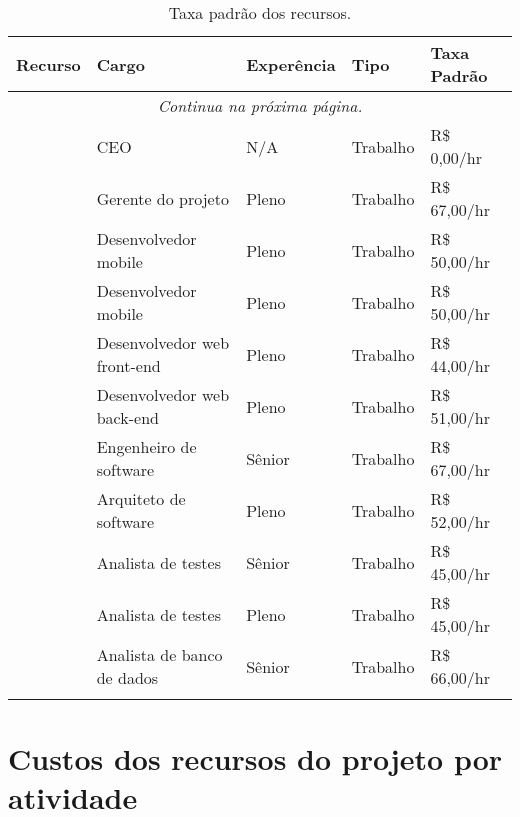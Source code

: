 \begin{longtable}{ p{} p{} l l l }
	\toprule
	\textbf{Recurso}      & \textbf{Cargo}              & \textbf{Experência} & \textbf{Tipo} & \textbf{Taxa Padrão} \\
	\midrule
	\endhead
	\multicolumn{5}{c}{{\textit{Continua na próxima página.}}} \\
	\caption{Taxa padrão dos recursos.}
	\endfoot
	\endlastfoot
	\ceoName{}            & CEO                         & N/A                  & Trabalho      & R\$ 0,00/hr           \\
	\midrule
	\projectManagerName{} & Gerente do projeto          & Pleno                & Trabalho      & R\$ 67,00/hr          \\
	\midrule
	\mobDevOneName{}      & Desenvolvedor mobile        & Pleno                & Trabalho      & R\$ 50,00/hr          \\
	\midrule
	\mobDevTwoName{}      & Desenvolvedor mobile        & Pleno                & Trabalho      & R\$ 50,00/hr          \\
	\midrule
	\frontWebDevName{}    & Desenvolvedor web front-end & Pleno                & Trabalho      & R\$ 44,00/hr          \\
	\midrule
	\backWebDevName{}     & Desenvolvedor web back-end  & Pleno                & Trabalho      & R\$ 51,00/hr          \\
	\midrule
	\softEngName{}        & Engenheiro de software      & Sênior              & Trabalho      & R\$ 67,00/hr          \\
	\midrule
	\softArcName{}        & Arquiteto de software       & Pleno                & Trabalho      & R\$ 52,00/hr          \\
	\midrule
	\testAnalOneName{}    & Analista de testes          & Sênior              & Trabalho      & R\$ 45,00/hr          \\
	\midrule
	\testAnalTwoName{}    & Analista de testes          & Pleno                & Trabalho      & R\$ 45,00/hr          \\
	\midrule
	\dbAnalName{}         & Analista de banco de dados  & Sênior              & Trabalho      & R\$ 66,00/hr          \\
	\bottomrule
	\caption{Taxa padrão dos recursos.}
	\centering
\end{longtable}

\section{Custos dos recursos do projeto por atividade}

